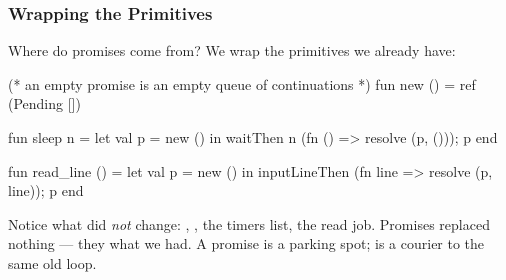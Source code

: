 \documentclass[aspectratio=169]{beamer}
\begin{document}
\begin{frame}[fragile]
  \frametitle{Wrapping the Primitives}

  Where do promises come from? We wrap the primitives we already have:

  \begin{codeblock}
    (* an empty promise is an empty queue of continuations *)
    fun new () = ref (Pending [])

    fun sleep n =
      let val p = new ()
      in waitThen n (fn () => resolve (p, ())); p end

    fun read_line () =
      let val p = new ()
      in inputLineThen (fn line => resolve (p, line)); p end
\end{codeblock}

  \pause
  \vspace{\fill}

  Notice what did \textit{not} change: ,
  , the timers list, the read job. Promises
  replaced nothing --- they  what we had. A promise is a
  parking spot;  is a courier to the same old loop.
\end{frame}






\end{document}
